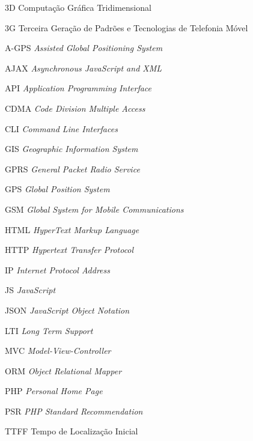 
\begin{siglas}
    \item[3D] Computação Gráfica Tridimensional
    \item[3G] Terceira Geração de Padrões e Tecnologias de Telefonia Móvel
    \item[A-GPS] \textit{Assisted Global Positioning System}
    \item[AJAX] \textit{Asynchronous JavaScript and XML}
    \item[API] \textit{Application Programming Interface}
    \item[CDMA] \textit{Code Division Multiple Access}
    \item[CLI] \textit{Command Line Interfaces}
    \item[GIS] \textit{Geographic Information System}
    \item[GPRS] \textit{General Packet Radio Service}
    \item[GPS] \textit{Global Position System}
    \item[GSM] \textit{Global System for Mobile Communications}
    \item[HTML] \textit{HyperText Markup Language}
    \item[HTTP] \textit{Hypertext Transfer Protocol}
    \item[IP] \textit{Internet Protocol Address}
    \item[JS] \textit{JavaScript}
    \item[JSON] \textit{JavaScript Object Notation}
    \item[LTI] \textit{Long Term Support}
    \item[MVC] \textit{Model-View-Controller}
    \item[ORM] \textit{Object Relational Mapper}
    \item[PHP] \textit{Personal Home Page}
    \item[PSR] \textit{PHP Standard Recommendation}
    \item[TTFF] Tempo de Localização Inicial
\end{siglas}

